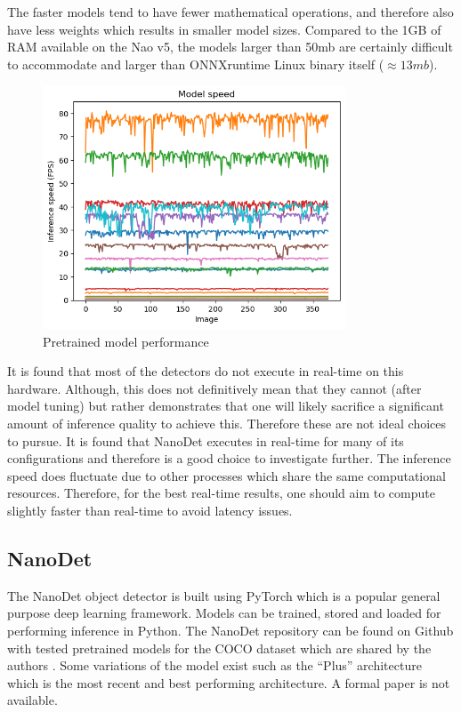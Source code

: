 \documentclass[a4paper,twoside,12pt]{report}
\begin{document}
The faster models tend to have fewer mathematical operations, and therefore also have less weights which results in smaller model sizes. Compared to the 1GB of RAM available on the Nao v5, the models larger than 50mb are certainly difficult to accommodate and larger than ONNXruntime Linux binary itself ($\approx13mb$).

\begin{figure}[h!]
\begin{center}
\includegraphics[width=9cm]{images/modelspeed.png}
\caption{Pretrained model performance}
\label{fig:modelspeed}
\end{center}
\end{figure}

It is found that most of the detectors do not execute in real-time on this hardware. Although, this does not definitively mean that they cannot (after model tuning) but rather demonstrates that one will likely sacrifice a significant amount of inference quality to achieve this. Therefore these are not ideal choices to pursue. It is found that NanoDet executes in real-time for many of its configurations and therefore is a good choice to investigate further. The inference speed does fluctuate due to other processes which share the same computational resources. Therefore, for the best real-time results, one should aim to compute slightly faster than real-time to avoid latency issues. 

\subsection{NanoDet}

The NanoDet object detector is built using PyTorch which is a popular general purpose deep learning framework. Models can be trained, stored and loaded for performing inference in Python. The NanoDet repository can be found on Github with tested pretrained models for the COCO dataset which are shared by the authors \citep{nanodet}. Some variations of the model exist such as the ``Plus'' architecture which is the most recent and best performing architecture. A formal paper is not available.
\end{document}
